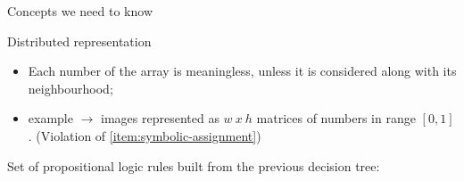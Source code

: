 \documentclass[presentation]{beamer}\mode<presentation>{\usetheme{AMSBolognaFC}}
\begin{document}
\begin{frame}[allowframebreaks]{Concepts we need to know}
    \begin{block}{Distributed representation}
        \begin{itemize}
            \item Each number of the array is meaningless, unless it is considered along with its neighbourhood;
            \item example $\rightarrow$ images represented as $w\ x\ h$ matrices of numbers in range $[0,1]$.
            (Violation of \cref{item:symbolic-assignment})
        \end{itemize}
    \end{block}
    
    \framebreak
    
     \begin{figure}
        \centering
        \qquad
        \centering
    \end{figure}
    
    \framebreak
    
    Set of propositional logic rules built from the previous decision tree:
    

\end{frame}
\end{document}
